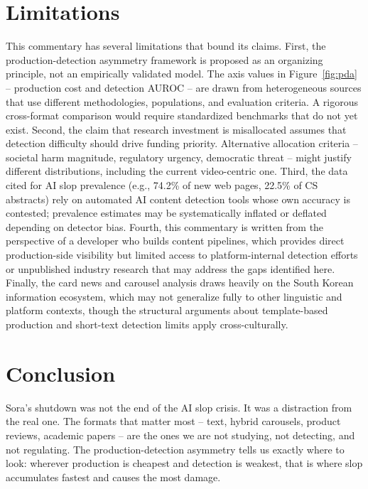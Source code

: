 \documentclass[12pt]{article}
\begin{document}
\section{Limitations}

This commentary has several limitations that bound its claims. First, the production-detection asymmetry framework is proposed as an organizing principle, not an empirically validated model. The axis values in Figure~\ref{fig:pda} -- production cost and detection AUROC -- are drawn from heterogeneous sources that use different methodologies, populations, and evaluation criteria. A rigorous cross-format comparison would require standardized benchmarks that do not yet exist. Second, the claim that research investment is misallocated assumes that detection difficulty should drive funding priority. Alternative allocation criteria -- societal harm magnitude, regulatory urgency, democratic threat -- might justify different distributions, including the current video-centric one. Third, the data cited for AI slop prevalence (e.g., 74.2\% of new web pages, 22.5\% of CS abstracts) rely on automated AI content detection tools whose own accuracy is contested; prevalence estimates may be systematically inflated or deflated depending on detector bias. Fourth, this commentary is written from the perspective of a developer who builds content pipelines, which provides direct production-side visibility but limited access to platform-internal detection efforts or unpublished industry research that may address the gaps identified here. Finally, the card news and carousel analysis draws heavily on the South Korean information ecosystem, which may not generalize fully to other linguistic and platform contexts, though the structural arguments about template-based production and short-text detection limits apply cross-culturally.

\section{Conclusion}

Sora's shutdown was not the end of the AI slop crisis. It was a distraction from the real one. The formats that matter most -- text, hybrid carousels, product reviews, academic papers -- are the ones we are not studying, not detecting, and not regulating. The production-detection asymmetry tells us exactly where to look: wherever production is cheapest and detection is weakest, that is where slop accumulates fastest and causes the most damage.
\end{document}
